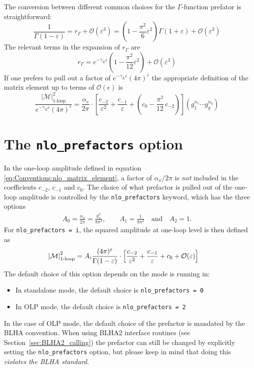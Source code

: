 The conversion between different common choices for the $\Gamma$-function prefator is straightforward:
\begin{equation}
\frac{1}{\Gamma(1-\varepsilon)}=r_\Gamma+{\mathcal O}(\varepsilon^3)=
\left(1-\frac{\pi^2}{6}\varepsilon^2\right)\Gamma(1+\varepsilon)
   +{\mathcal O}(\varepsilon^3)
\end{equation}
The relevant terms in the expansion of $r_\Gamma$ are
\begin{equation}
r_\Gamma=e^{-\gamma_E\varepsilon}
\left(1-\frac{\pi^2}{12}\varepsilon^2\right)+\mathcal{O}(\varepsilon^3)
\end{equation}
If one prefers to pull out a factor of $e^{-\gamma_E\varepsilon}(4\pi)^{\varepsilon}$ the appropriate definition of the matrix element up to terms of $\mathcal{O}(\epsilon)$ is
\begin{equation}
\frac{\left\vert\mathcal{M}\right\vert^2_{\text{1-loop}}}%
{e^{-\gamma_E\varepsilon}(4\pi)^\epsilon}=
\frac{\alpha_s}{2\pi}
\cdot\left[\frac{c_{-2}}{\varepsilon^2}+\frac{c_{-1}}{\varepsilon}
+\left(c_0-\frac{\pi^2}{12}\,c_{-2}\right)
\right](g_1^{n_1}\cdots g_q^{n_q})
\end{equation}


\section{The \texttt{nlo\_prefactors} option}
\label{sec:nlo_prefactors}
In the one-loop amplitude defined in equation \eqref{eq:Conventions:nlo_matrix_element}, a factor of $\alpha_x/2\pi$ is \emph{not} included in the coefficients $c_{-2}$, $c_{-1}$ and $c_0$. The choice of what prefactor is pulled out of the one-loop amplitude is controlled by the \texttt{nlo\_prefactors} keyword, which has the three options
\begin{eqnarray}
   A_0 = \frac{\alpha_x}{2\pi}=\frac{g_x^2}{8\pi^2}, \qquad A_1 = \frac{1}{8 \pi^2} \quad \text{and} \quad A_2 = 1.
\end{eqnarray}
For \texttt{nlo\_prefactors = i}, the squared amplitude at one-loop level is then defined as
\begin{align}
  \left\vert\mathcal{M}\right\vert^2_{\text{1-loop}}
    &= A_i\frac{(4\pi)^\varepsilon}{\Gamma(1-\varepsilon)}\cdot\left[
      \frac{c_{-2}}{\varepsilon^2}+\frac{c_{-1}}{\varepsilon}+c_0+{\mathcal{O}}(\varepsilon)\right]
\end{align}
The default choice of this option depends on the mode \gosam is running in:
\begin{itemize}
   \item In standalone mode, the default choice is \texttt{nlo\_prefactors = 0}
   \item In OLP mode, the default choice is \texttt{nlo\_prefactors = 2}
\end{itemize}
In the case of OLP mode, the default choice of the prefactor is mandated by the BLHA convention. When using BLHA2 interface routines (see Section~\ref{sec:BLHA2_calling}) the prefactor can still be changed by explicitly setting the \texttt{nlo\_prefactors} option, but please keep in mind that doing this \emph{violates the BLHA standard}.

